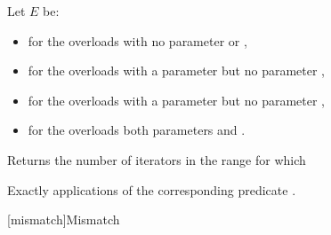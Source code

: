\begin{itemdescr}
\begin{addedblock}
\pnum
Let $E$ be:
\begin{itemize}
\item {} for the overloads with no parameter  or ,
\item {} for the overloads with a parameter  but no parameter ,
\item {} for the overloads with a parameter  but no parameter ,
\item {} for the overloads both parameters  and .
\end{itemize}
\end{addedblock}

\pnum
\effects
Returns the number of iterators
in the range 
for which  

\pnum
\complexity
Exactly
applications of the corresponding predicate .
\end{itemdescr}

[mismatch]{Mismatch}

